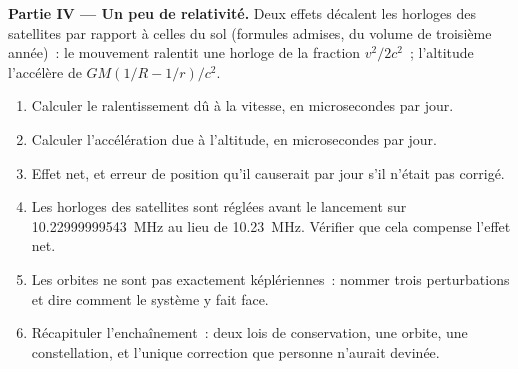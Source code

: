 \begin{problem}
\medskip
\noindent\textbf{Partie IV --- Un peu de relativité.}
Deux effets décalent les horloges des satellites par rapport à celles du
sol (formules admises, du volume de troisième année)~: le mouvement
ralentit une horloge de la fraction $v^2/2c^2$~; l'altitude l'accélère
de $GM(1/R - 1/r)/c^2$.
\begin{enumerate}[resume]
  \item Calculer le ralentissement dû à la vitesse, en microsecondes par
        jour.
  \item Calculer l'accélération due à l'altitude, en microsecondes par
        jour.
  \item Effet net, et erreur de position qu'il causerait par jour s'il
        n'était pas corrigé.
  \item Les horloges des satellites sont réglées avant le lancement sur
        \qty{10.22999999543}{MHz} au lieu de \qty{10.23}{MHz}. Vérifier
        que cela compense l'effet net.
  \item Les orbites ne sont pas exactement képlériennes~: nommer trois
        perturbations et dire comment le système y fait face.
  \item Récapituler l'enchaînement~: deux lois de conservation, une
        orbite, une constellation, et l'unique correction que personne
        n'aurait devinée.
\end{enumerate}
\end{problem}

